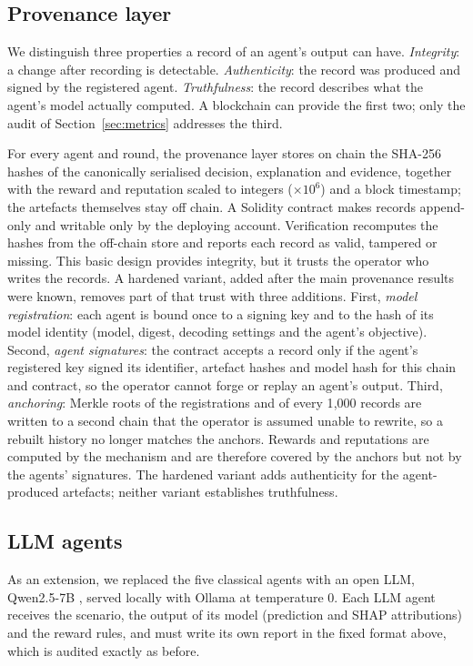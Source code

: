 \documentclass[pdflatex,sn-basic]{sn-jnl}
\begin{document}
\subsection{Provenance layer}\label{sec:provenance}

We distinguish three properties a record of an agent's output can have. \emph{Integrity}: a
change after recording is detectable. \emph{Authenticity}: the record was produced and signed
by the registered agent. \emph{Truthfulness}: the record describes what the agent's model
actually computed. A blockchain can provide the first two; only the audit of
Section~\ref{sec:metrics} addresses the third.

For every agent and round, the provenance layer stores on chain the SHA-256 hashes of the
canonically serialised decision, explanation and evidence, together with the reward and
reputation scaled to integers ($\times10^{6}$) and a block timestamp; the artefacts
themselves stay off chain. A Solidity contract makes records append-only and writable only
by the deploying account. Verification recomputes the hashes from the off-chain store and
reports each record as valid, tampered or missing. This basic design provides integrity, but
it trusts the operator who writes the records. A hardened variant, added after the
main provenance results were known, removes part of that trust with three additions. First,
\emph{model registration}: each agent is bound once to a signing key and to the hash of its
model identity (model, digest, decoding settings and the agent's objective). Second,
\emph{agent signatures}: the contract accepts a record only if the agent's registered key
signed its identifier, artefact hashes and model hash for this chain and contract, so the
operator cannot forge or replay an agent's output. Third, \emph{anchoring}: Merkle roots
\citep{laurie2013} of the registrations and of every 1{,}000 records are written to
a second chain that the operator is assumed unable to rewrite, so a rebuilt history no longer
matches the anchors. Rewards and reputations are computed by the mechanism and are therefore
covered by the anchors but not by the agents' signatures. The hardened variant adds
authenticity for the agent-produced artefacts; neither variant establishes truthfulness.

\subsection{LLM agents}\label{sec:llm}

As an extension, we replaced the five classical agents with an open LLM, Qwen2.5-7B
\citep{qwen2024}, served locally with Ollama at temperature 0. Each LLM agent receives the
scenario, the output of its model (prediction and SHAP attributions) and the reward rules, and
must write its own report in the fixed format above, which is audited exactly as before.
\end{document}
